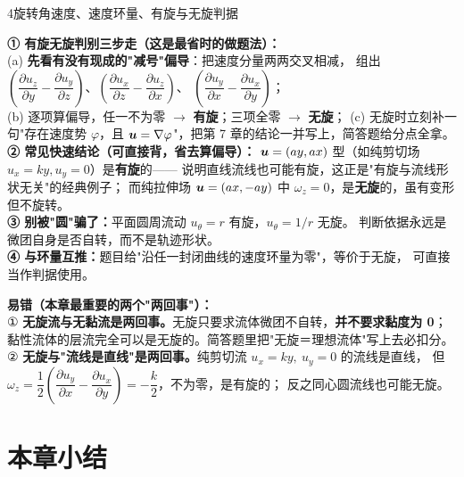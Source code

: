 \begin{kaodian}{4}{旋转角速度、速度环量、有旋与无旋判据}
\begin{banfa}
\textbf{① 有旋无旋判别三步走（这是最省时的做题法）：}\\
(a) \textbf{先看有没有现成的"减号"偏导}：把速度分量两两交叉相减，
组出 $\left(\dfrac{\partial u_z}{\partial y}-\dfrac{\partial u_y}{\partial z}\right)$、$\left(\dfrac{\partial u_x}{\partial z}-\dfrac{\partial u_z}{\partial x}\right)$、
$\left(\dfrac{\partial u_y}{\partial x}-\dfrac{\partial u_x}{\partial y}\right)$；\\
(b) 逐项算偏导，任一不为零 $\to$ \textbf{有旋}；三项全零 $\to$ \textbf{无旋}；
(c) 无旋时立刻补一句"存在速度势 $\varphi$，且 $\bm{u}=\nabla\varphi$"，把第 7 章的结论一并写上，简答题给分点全拿。\\
\textbf{② 常见快速结论（可直接背，省去算偏导）：}
$\bm{u}=(ay,ax)$ 型（如纯剪切场 $u_x=ky,u_y=0$）是\textbf{有旋}的——
说明直线流线也可能有旋，这正是"有旋与流线形状无关"的经典例子；
而纯拉伸场 $\bm{u}=(ax,-ay)$ 中 $\omega_z=0$，是\textbf{无旋}的，虽有变形但不旋转。\\
\textbf{③ 别被"圆"骗了：}平面圆周流动 $u_\theta=r$ 有旋，$u_\theta=1/r$ 无旋。
判断依据永远是微团自身是否自转，而不是轨迹形状。\\
\textbf{④ 与环量互推：}题目给"沿任一封闭曲线的速度环量为零"，等价于无旋，
可直接当作判据使用。
\end{banfa}

\begin{yicuo}
\textbf{易错（本章最重要的两个"两回事"）：}\\
① \textbf{无旋流与无黏流是两回事。}无旋只要求流体微团不自转，\textbf{并不要求黏度为 0}；
黏性流体的层流完全可以是无旋的。简答题里把"无旋＝理想流体"写上去必扣分。\\
② \textbf{无旋与"流线是直线"是两回事。}纯剪切流 $u_x=ky,\ u_y=0$ 的流线是直线，
但 $\omega_z=\dfrac12\!\left(\dfrac{\partial u_y}{\partial x}-\dfrac{\partial u_x}{\partial y}\right)=-\dfrac{k}{2}$，不为零，是有旋的；
反之同心圆流线也可能无旋。
\end{yicuo}
\end{kaodian}

\section{本章小结}

